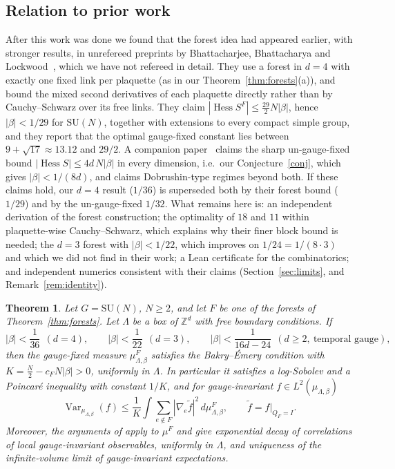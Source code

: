 \documentclass[11pt]{amsart}
\newtheorem{theorem}{Theorem}[section]
\theoremstyle{definition}
\theoremstyle{remark}
\newcommand{\Hess}{\operatorname{Hess}}
\newcommand{\SU}{\mathrm{SU}}
\begin{document}
\subsection*{Relation to prior work}
After this work was done we found that the forest idea had appeared earlier, with stronger results, in unrefereed
preprints by Bhattacharjee, Bhattacharya and Lockwood~\cite{BBL,BB-zen}, which we have not refereed in detail. They use a
forest in $d=4$ with exactly one fixed link per plaquette (as in our Theorem~\ref{thm:forests}(a)), and bound the
mixed second derivatives of each plaquette directly rather than by Cauchy--Schwarz over its free links. They claim
$|\Hess S^F|\le\frac{29}{2}N|\beta|$, hence $|\beta|<1/29$ for $\SU(N)$, together with extensions to every compact
simple group, and they report that the optimal gauge-fixed constant lies between $9+\sqrt{17}\approx13.12$ and
$29/2$. A companion paper~\cite{BB-sharp} claims the sharp un-gauge-fixed bound $|\Hess S|\le 4d\,N|\beta|$ in
every dimension, i.e.\ our Conjecture~\ref{conj}, which gives $|\beta|<1/(8d)$, and claims Dobrushin-type regimes
beyond both. If these claims hold, our $d=4$ result ($1/36$) is superseded both by their forest bound ($1/29$) and
by the un-gauge-fixed $1/32$. What remains here is: an independent derivation of the forest construction; the
optimality of $18$ and $11$ within plaquette-wise Cauchy--Schwarz, which explains why their finer
block bound is needed; the $d=3$ forest with $|\beta|<1/22$, which improves on $1/24=1/(8\cdot3)$ and which we
did not find in their work; a Lean certificate for the combinatorics; and independent numerics consistent with
their claims (Section~\ref{sec:limits}, and Remark~\ref{rem:identity}).

\begin{theorem}\label{thm:main}
Let $G=\SU(N)$, $N\ge2$, and let $F$ be one of the forests of Theorem~\ref{thm:forests}. Let $\Lambda$ be a box of
$\mathbb{Z}^d$ with free boundary conditions. If
\[
|\beta|<\frac{1}{36}\ \ (d=4),\qquad |\beta|<\frac{1}{22}\ \ (d=3),\qquad |\beta|<\frac{1}{16d-24}\ \ (d\ge2,\ \text{temporal gauge}),
\]
then the gauge-fixed measure $\mu^F_{\Lambda,\beta}$ satisfies the Bakry--\'Emery condition with
$K=\frac{N}{2}-c_F N|\beta|>0$, uniformly in $\Lambda$. In particular it satisfies a log-Sobolev and a Poincar\'e
inequality with constant $1/K$, and for gauge-invariant $f\in L^2(\mu_{\Lambda,\beta})$
\[
\operatorname{Var}_{\mu_{\Lambda,\beta}}(f)\le \frac{1}{K}\int\sum_{e\notin F}|\nabla_e \tilde f|^2\,d\mu^F_{\Lambda,\beta},
\qquad \tilde f=f|_{Q_F=I}.
\]
Moreover, the arguments of \cite[Theorem~1.2, Corollary~1.6]{SZZ} apply to $\mu^F$ and give exponential decay of
correlations of local gauge-invariant observables, uniformly in $\Lambda$, and uniqueness of the infinite-volume limit
of gauge-invariant expectations.
\end{theorem}
\end{document}
